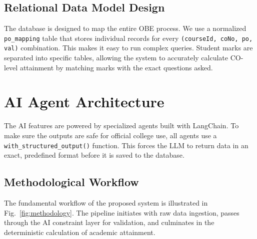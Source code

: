 \documentclass[conference]{IEEEtran}
\begin{document}
\subsection{Relational Data Model Design}
The database is designed to map the entire OBE process. We use a normalized \texttt{po\_mapping} table that stores individual records for every \texttt{(courseId, coNo, po, val)} combination. This makes it easy to run complex queries. Student marks are separated into specific tables, allowing the system to accurately calculate CO-level attainment by matching marks with the exact questions asked.

\section{AI Agent Architecture}

The AI features are powered by specialized agents built with LangChain. To make sure the outputs are safe for official college use, all agents use a \texttt{with\_structured\_output()} function. This forces the LLM to return data in an exact, predefined format before it is saved to the database.

\subsection{Methodological Workflow}

The fundamental workflow of the proposed system is illustrated in Fig.~\ref{fig:methodology}. The pipeline initiates with raw data ingestion, passes through the AI constraint layer for validation, and culminates in the deterministic calculation of academic attainment.
\end{document}
